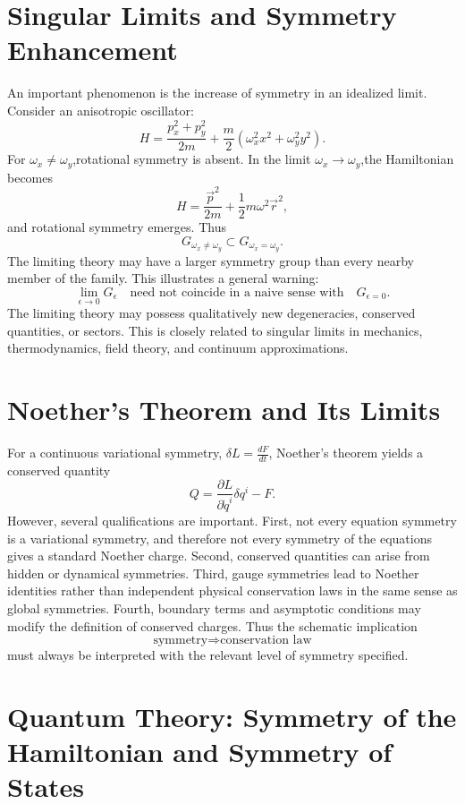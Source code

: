 \section{Singular Limits and Symmetry Enhancement}
\label{sp:sl}

An important phenomenon is the  increase  of symmetry in an idealized limit.
Consider an anisotropic oscillator:
\[H=\frac{p_x^2+p_y^2}{2m}+\frac{m}{2}(\omega_x^2x^2+\omega_y^2y^2).\]
For $\omega_x\neq\omega_y$,rotational symmetry is absent.
In the limit $\omega_x\rightarrow\omega_y$,the Hamiltonian becomes
\[H=\frac{\vec{p}^2}{2m}+\frac12m\omega^2\vec{r}^2,\]
and rotational symmetry emerges.
Thus
\[
G_{\omega_x\neq\omega_y}\subset G_{\omega_x=\omega_y}.\]
The limiting theory may have a larger symmetry group than every nearby member of the family.
This illustrates a general warning:
\[\boxed{\lim_{\epsilon\to0}G_\epsilon\quad\text{need not coincide in a 
naive sense with}\quad G_{\epsilon=0}.}\]
The limiting theory may possess qualitatively new degeneracies, conserved quantities, or sectors.
This is closely related to singular limits in mechanics, thermodynamics, field theory, and continuum approximations.

\section{Noether's Theorem and Its Limits}
\label{sp:nt}

For a continuous variational symmetry, $\delta L=\tfrac{dF}{dt}$,
Noether's theorem yields a conserved quantity
\[Q=\frac{\partial L}{\partial\dot q^i}\delta q^i-F.\]
However, several qualifications are important.
First, not every equation symmetry is a variational symmetry, and therefore not
every symmetry of the equations gives a standard Noether charge.
Second, conserved quantities can arise from hidden or dynamical symmetries.
Third, gauge symmetries lead to Noether identities rather than independent
physical conservation laws in the same sense as global symmetries.
Fourth, boundary terms and asymptotic conditions may modify the definition of
conserved charges.
Thus the schematic implication
\[\text{symmetry}\Longrightarrow\text{conservation law}\]
must always be interpreted with the relevant level of symmetry specified.

\section{Quantum Theory: Symmetry of the Hamiltonian and Symmetry of States}
\label{sp:qt}

